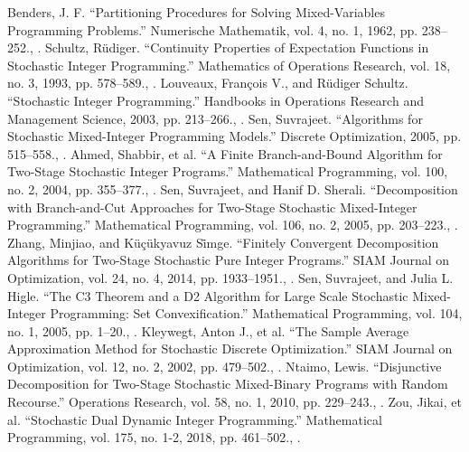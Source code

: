 \documentclass{article}
\theoremstyle{plain}
\theoremstyle{definition}
\begin{document}
\begin{thebibliography}{99}
Benders, J. F. “Partitioning Procedures for Solving Mixed-Variables Programming Problems.” Numerische Mathematik, vol. 4, no. 1, 1962, pp. 238–252., .
Schultz, Rüdiger. “Continuity Properties of Expectation Functions in Stochastic Integer Programming.” Mathematics of Operations Research, vol. 18, no. 3, 1993, pp. 578–589., . 
Louveaux, François V., and Rüdiger Schultz. “Stochastic Integer Programming.” Handbooks in Operations Research and Management Science, 2003, pp. 213–266., . 
Sen, Suvrajeet. “Algorithms for Stochastic Mixed-Integer Programming Models.” Discrete Optimization, 2005, pp. 515–558., . 
Ahmed, Shabbir, et al. “A Finite Branch-and-Bound Algorithm for Two-Stage Stochastic Integer Programs.” Mathematical Programming, vol. 100, no. 2, 2004, pp. 355–377., . 
Sen, Suvrajeet, and Hanif D. Sherali. “Decomposition with Branch-and-Cut Approaches for Two-Stage Stochastic Mixed-Integer Programming.” Mathematical Programming, vol. 106, no. 2, 2005, pp. 203–223., . 
Zhang, Minjiao, and Küçükyavuz Si̇mge. “Finitely Convergent Decomposition Algorithms for Two-Stage Stochastic Pure Integer Programs.” SIAM Journal on Optimization, vol. 24, no. 4, 2014, pp. 1933–1951., . 
Sen, Suvrajeet, and Julia L. Higle. “The C3 Theorem and a D2 Algorithm for Large Scale Stochastic Mixed-Integer Programming: Set Convexification.” Mathematical Programming, vol. 104, no. 1, 2005, pp. 1–20., .
Kleywegt, Anton J., et al. “The Sample Average Approximation Method for Stochastic Discrete Optimization.” SIAM Journal on Optimization, vol. 12, no. 2, 2002, pp. 479–502., . 
Ntaimo, Lewis. “Disjunctive Decomposition for Two-Stage Stochastic Mixed-Binary Programs with Random Recourse.” Operations Research, vol. 58, no. 1, 2010, pp. 229–243., .
Zou, Jikai, et al. “Stochastic Dual Dynamic Integer Programming.” Mathematical Programming, vol. 175, no. 1-2, 2018, pp. 461–502., . 

\end{thebibliography}
\end{document}
